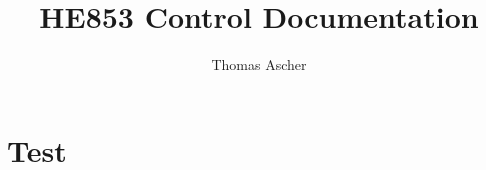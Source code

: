 \documentclass[
a4paper,
oneside,
halfparskip*,
normalheadings,
]
{scrbook}
\begin{document}
\title{HE853 Control Documentation}
\author{Thomas Ascher}
\maketitle
\tableofcontents
\frontmatter


\mainmatter
\chapter{Test}
\end{document}
